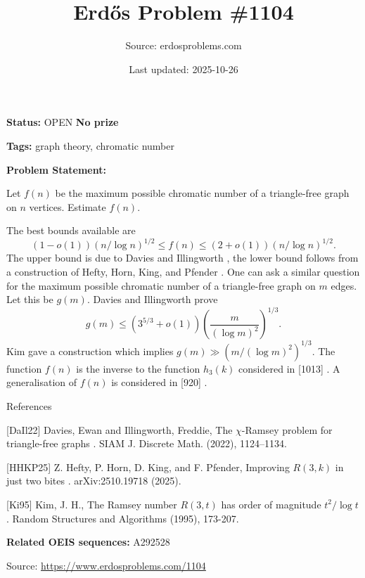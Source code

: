 \documentclass{article}
\title{Erd\H{o}s Problem \#1104}
\date{Last updated: 2025-10-26}
\author{Source: erdosproblems.com}
\begin{document}
\maketitle

\noindent\textbf{Status:} OPEN \quad \textbf{No prize}

\noindent\textbf{Tags:} graph theory, chromatic number

\medskip

\noindent\textbf{Problem Statement:}

Let $f(n)$ be the maximum possible chromatic number of a triangle-free graph on $n$ vertices. Estimate $f(n)$.




The best bounds available are\[(1-o(1))(n/\log n)^{1/2}\leq f(n) \leq (2+o(1))(n/\log n)^{1/2}.\]The upper bound is due to Davies and Illingworth \cite{DaIl22}, the lower bound follows from a construction of Hefty, Horn, King, and Pfender \cite{HHKP25}. One can ask a similar question for the maximum possible chromatic number of a triangle-free graph on $m$ edges. Let this be $g(m)$. Davies and Illingworth \cite{DaIl22} prove\[g(m) \leq (3^{5/3}+o(1))\left(\frac{m}{(\log m)^2}\right)^{1/3}.\]Kim \cite{Ki95} gave a construction which implies $g(m) \gg (m/(\log m)^2)^{1/3}$. The function $f(n)$ is the inverse to the function $h_3(k)$ considered in [1013] . A generalisation of $f(n)$ is considered in [920] .




References

[DaIl22] Davies, Ewan and Illingworth, Freddie, The {$\chi$}-{R}amsey problem for triangle-free graphs . SIAM J. Discrete Math. (2022), 1124--1134.

[HHKP25] Z. Hefty, P. Horn, D. King, and F. Pfender, Improving $R(3,k)$ in just two bites . arXiv:2510.19718 (2025).

[Ki95] Kim, J. H., The Ramsey number $R(3,t)$ has order of magnitude $t^2/\log t$ . Random Structures and Algorithms (1995), 173-207.

\noindent\textbf{Related OEIS sequences:} A292528


\bigskip
\noindent\small{Source: \url{https://www.erdosproblems.com/1104}}
\end{document}

